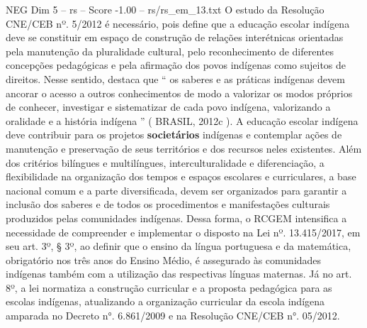 \begin{textsample}{NEG Dim 5 – rs – Score -1.00 – rs/rs\_em\_13.txt}
O estudo da Resolução CNE/CEB nº. 5/2012 é necessário, pois define que a educação escolar indígena deve se constituir em espaço de construção de relações interétnicas orientadas pela manutenção da pluralidade cultural, pelo reconhecimento de diferentes concepções pedagógicas e pela afirmação dos povos indígenas como sujeitos de direitos.
Nesse sentido, destaca que “ os saberes e as práticas indígenas devem ancorar o acesso a outros conhecimentos de modo a valorizar os modos próprios de conhecer, investigar e sistematizar de cada povo indígena, valorizando a oralidade e a história indígena ” ( BRASIL, 2012c ).
A educação escolar indígena deve contribuir para os projetos \textbf{societários} indígenas e contemplar ações de manutenção e preservação de seus territórios e dos recursos neles existentes.
Além dos critérios bilíngues e multilíngues, interculturalidade e diferenciação, a flexibilidade na organização dos tempos e espaços escolares e curriculares, a base nacional comum e a parte diversificada, devem ser organizados para garantir a inclusão dos saberes e de todos os procedimentos e manifestações culturais produzidos pelas comunidades indígenas.
Dessa forma, o RCGEM intensifica a necessidade de compreender e implementar o disposto na Lei nº. 13.415/2017, em seu art. 3º, § 3º, ao definir que o ensino da língua portuguesa e da matemática, obrigatório nos três anos do Ensino Médio, é assegurado às comunidades indígenas também com a utilização das respectivas línguas maternas.
Já no art. 8º, a lei normatiza a construção curricular e a proposta pedagógica para as escolas indígenas, atualizando a organização curricular da escola indígena amparada no Decreto n{\EmojiFont °}. 6.861/2009 e na Resolução CNE/CEB n{\EmojiFont °}. 05/2012.

\end{textsample}
